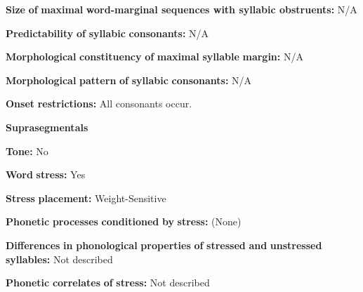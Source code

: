 \documentclass[output=paper]{langsci/langscibook}
\begin{document}
\begin{styleBody}
\textbf{Size} \textbf{of} \textbf{maximal} \textbf{word{}-marginal sequences with syllabic obstruents:} N/A
\end{styleBody}

\begin{styleBody}
\textbf{Predictability} \textbf{of} \textbf{syllabic} \textbf{consonants:} N/A
\end{styleBody}

\begin{styleBody}
\textbf{Morphological} \textbf{constituency} \textbf{of} \textbf{maximal} \textbf{syllable} \textbf{margin:} N/A
\end{styleBody}

\begin{styleBody}
\textbf{Morphological} \textbf{pattern} \textbf{of} \textbf{syllabic} \textbf{consonants:} N/A
\end{styleBody}

\begin{styleBody}
\textbf{Onset} \textbf{restrictions:} All consonants occur.
\end{styleBody}

\begin{styleBody}
\textbf{Suprasegmentals}
\end{styleBody}

\begin{styleBody}
\textbf{Tone:} No
\end{styleBody}

\begin{styleBody}
\textbf{Word} \textbf{stress:} Yes
\end{styleBody}

\begin{styleBody}
\textbf{Stress} \textbf{placement:} Weight-Sensitive
\end{styleBody}

\begin{styleBody}
\textbf{Phonetic} \textbf{processes} \textbf{conditioned} \textbf{by} \textbf{stress:} (None)
\end{styleBody}

\begin{styleBody}
\textbf{Differences} \textbf{in} \textbf{phonological} \textbf{properties} \textbf{of} \textbf{stressed} \textbf{and} \textbf{unstressed} \textbf{syllables:} Not described
\end{styleBody}

\begin{styleBody}
\textbf{Phonetic} \textbf{correlates} \textbf{of} \textbf{stress:} Not described
\end{styleBody}
\end{document}
